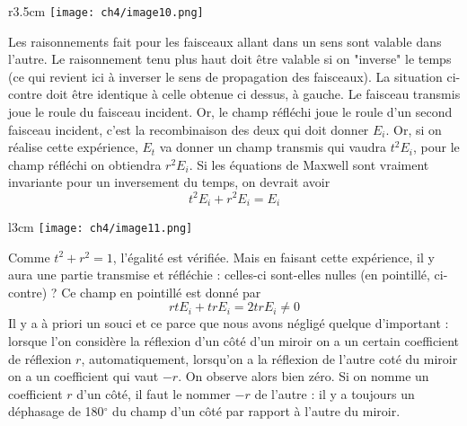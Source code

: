 	\begin{wrapfigure}[7]{r}{3.5cm}
	\vspace{-5mm}
	\texttt{[image: ch4/image10.png]}
	\end{wrapfigure}
Les raisonnements fait pour les faisceaux allant dans un sens sont valable dans l'autre. Le 
raisonnement tenu plus haut doit être valable si on "inverse" le temps (ce qui revient ici à 
inverser le sens de propagation des faisceaux). La situation ci-contre doit être identique à 
celle obtenue ci dessus, à gauche. Le faisceau transmis joue le roule du faisceau incident. Or, 
le champ réfléchi joue le roule d'un second faisceau incident, c'est la recombinaison des 
deux qui doit donner $E_i$. Or, si on réalise cette expérience, $E_t$ va donner un champ transmis
qui vaudra $t^2 E_i$, pour le champ réfléchi on obtiendra $r^2 E_i$. Si les équations de 
Maxwell sont vraiment invariante pour un inversement du temps, on devrait avoir
\begin{equation}
t^2E_i+r^2E_i = E_i
\end{equation}

	\begin{wrapfigure}[6]{l}{3cm}
	\vspace{-15mm}
	\texttt{[image: ch4/image11.png]}
	\end{wrapfigure}
Comme $t^2+r^2=1$, l'égalité est vérifiée. Mais en faisant cette expérience, il y aura une 
partie transmise et réfléchie : celles-ci sont-elles nulles (en pointillé, ci-contre) ? Ce 
champ en pointillé est donné par
\begin{equation}
rtE_i + trE_i = 2tr E_i \neq 0
\end{equation}
Il y a à priori un souci et ce parce que nous avons négligé quelque d'important : lorsque l'on 
considère la réflexion d'un côté d'un miroir on a un certain coefficient de réflexion $r$, 
automatiquement, lorsqu'on a la réflexion de l'autre coté du miroir on a un coefficient qui 
vaut $-r$. On observe alors bien zéro. Si on nomme un coefficient $r$ d'un côté, il faut le 
nommer $-r$ de l'autre : il y a toujours un déphasage de 180$^\circ$ du champ d'un côté par 
rapport à l'autre du miroir. \\

